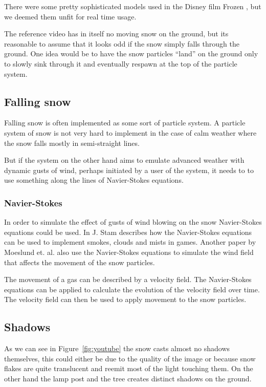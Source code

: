 \documentclass[a4paper,12pt]{article}
\begin{document}
There were some pretty sophisticated models used in the Disney film Frozen \cite{disney-snow}, but we deemed them unfit for real time usage.

The reference video has in itself no moving snow on the ground, but its reasonable to assume that it looks odd if the snow simply falls through the ground. One idea would be to have the snow particles ``land'' on the ground only to slowly sink through it and eventually respawn at the top of the particle system.


\subsection{Falling snow}

Falling snow is often implemented as some sort of particle system. A particle system of snow is not very hard to implement in the case of calm weather where the snow falls mostly in semi-straight lines.

But if the system on the other hand aims to emulate advanced weather with dynamic gusts of wind, perhaps initiated by a user of the system, it needs to to use something along the lines of Navier-Stokes equations.


\subsubsection{Navier-Stokes}

In order to simulate the effect of gusts of wind blowing on the snow Navier-Stokes equations could be used. In \cite{fluid-dynamics} J. Stam describes how the Navier-Stokes equations can be used to implement smokes, clouds and mists in games. Another paper \cite{modeling-falling-accumulating-snow} by Moeslund et. al. also use the Navier-Stokes equations to simulate the wind field that affects the movement of the snow particles.

The movement of a gas can be described by a velocity field. The Navier-Stokes equations can be applied to calculate the evolution of the velocity field over time. The velocity field can then be used to apply movement to the snow particles. \cite{fluid-dynamics}



\subsection{Shadows}

As we can see in Figure~\ref{fig:youtube} the snow casts almost no shadows themselves, this could either be due to the quality of the image or because snow flakes are quite translucent and reemit most of the light touching them. On the other hand the lamp post and the tree creates distinct shadows on the ground.
\end{document}
